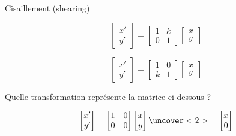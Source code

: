 \documentclass[compress]{beamer}
\begin{document}
\begin{frame}{Cisaillement (shearing)}
    \begin{multicols}{2}

\[
\begin{bmatrix} x' \\ y' \end{bmatrix} = \begin{bmatrix} 1 & k \\ 0 & 1
\end{bmatrix} \begin{bmatrix} x \\ y \end{bmatrix}
\]
    \centering

    \end{multicols}

    \begin{multicols}{2}

\[
\begin{bmatrix} x' \\ y' \end{bmatrix} = \begin{bmatrix} 1 & 0 \\ k & 1
\end{bmatrix} \begin{bmatrix} x \\ y \end{bmatrix}
\]
    \centering

    \end{multicols}


\end{frame}

\begin{frame}{}

Quelle transformation représente la matrice ci-dessous ?

\[
\begin{bmatrix} x' \\ y' \end{bmatrix} = \begin{bmatrix} 1 & 0 \\ 0 & 0
\end{bmatrix} \begin{bmatrix} x \\ y \end{bmatrix}
\uncover<2>{
= \begin{bmatrix} x \\ 0 \end{bmatrix} 
}
\]

\end{frame}
\end{document}
